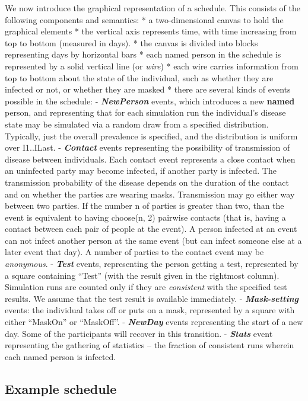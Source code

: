 \documentclass[11pt]{article}
\begin{document}
We now introduce the graphical representation of a schedule. This
consists of the following components and semantics: * a two-dimensional
canvas to hold the graphical elements * the vertical axis represents
time, with time increasing from top to bottom (measured in days). * the
canvas is divided into blocks representing days by horizontal bars *
each named person in the schedule is represented by a solid vertical
line (or \emph{wire}) * each wire carries information from top to bottom
about the state of the individual, such as whether they are infected or
not, or whether they are masked * there are several kinds of events
possible in the schedule: - \textbf{\emph{NewPerson}} events, which
introduces a new \textbf{named} person, and representing that for each
simulation run the individual's disease state may be simulated via a
random draw from a specified distribution. Typically, just the overall
prevalence is specified, and the distribution is uniform over I1..ILast.
- \textbf{\emph{Contact}} events representing the possibility of
transmission of disease between individuals. Each contact event
represents a close contact when an uninfected party may become infected,
if another party is infected. The transmission probability of the
disease depends on the duration of the contact and on whether the
parties are wearing masks. Transmission may go either way between two
parties. If the number n of parties is greater than two, than the event
is equivalent to having choose(n, 2) pairwise contacts (that is, having
a contact between each pair of people at the event). A person infected
at an event can not infect another person at the same event (but can
infect someone else at a later event that day). A number of parties to
the contact event may be \emph{anonymous}. - \textbf{\emph{Test}}
events, representing the person getting a test, represented by a square
containing ``Test'' (with the result given in the rightmost column).
Simulation runs are counted only if they are \emph{consistent} with the
specified test results. We assume that the test result is available
immediately. - \textbf{\emph{Mask-setting}} events: the individual takes
off or puts on a mask, represented by a square with either ``MaskOn'' or
``MaskOff''. - \textbf{\emph{NewDay}} events representing the start of a
new day. Some of the participants will recover in this transition. -
\textbf{\emph{Stats}} event representing the gathering of statistics --
the fraction of consistent runs wherein each named person is infected.

    \hypertarget{example-schedule}{%
\subsection{Example schedule}\label{example-schedule}}
\end{document}
